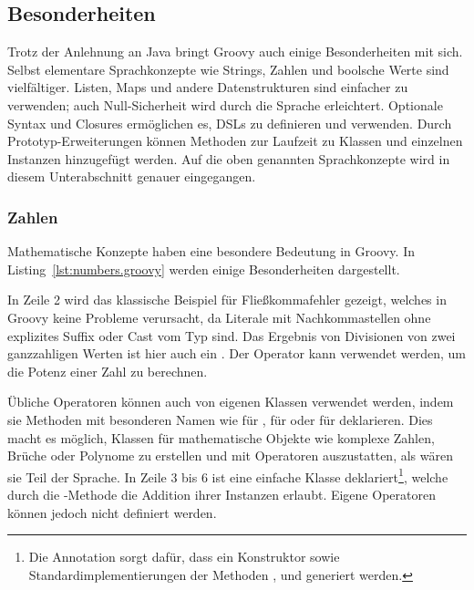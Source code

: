 \subsection{Besonderheiten}\label{subsec:besonderheiten}

Trotz der Anlehnung an Java bringt Groovy auch einige Besonderheiten mit sich.
Selbst elementare Sprachkonzepte wie Strings, Zahlen und boolsche Werte sind vielfältiger.
Listen, Maps und andere Datenstrukturen sind einfacher zu verwenden; auch Null-Sicherheit wird durch die Sprache erleichtert.
Optionale Syntax und Closures ermöglichen es, DSLs zu definieren und verwenden.
Durch Prototyp-Erweiterungen können Methoden zur Laufzeit zu Klassen und einzelnen Instanzen hinzugefügt werden.
Auf die oben genannten Sprachkonzepte wird in diesem Unterabschnitt genauer eingegangen.

\subsubsection{Zahlen}\label{subsubsec:zahlen}

Mathematische Konzepte haben eine besondere Bedeutung in Groovy.
In Listing~\ref{lst:numbers.groovy} werden einige Besonderheiten dargestellt.


In Zeile 2 wird das klassische Beispiel für Fließkommafehler gezeigt, welches in Groovy keine Probleme verursacht, da Literale mit Nachkommastellen ohne explizites Suffix oder Cast vom Typ  sind.
Das Ergebnis von Divisionen von zwei ganzzahligen Werten ist hier auch ein .
Der Operator \code{**} kann verwendet werden, um die Potenz einer Zahl zu berechnen.

Übliche Operatoren können auch von eigenen Klassen verwendet werden, indem sie Methoden mit besonderen Namen wie  für \code{+},  für \code{<<} oder  für \code{++} deklarieren.
Dies macht es möglich, Klassen für mathematische Objekte wie komplexe Zahlen, Brüche oder Polynome zu erstellen und mit Operatoren auszustatten, als wären sie Teil der Sprache.
In Zeile 3 bis 6 ist eine einfache Klasse  deklariert\footnote{Die Annotation  sorgt dafür, dass ein Konstruktor sowie Standardimplementierungen der Methoden ,  und  generiert werden.}, welche durch die -Methode die Addition ihrer Instanzen erlaubt.
Eigene Operatoren können jedoch nicht definiert werden.

